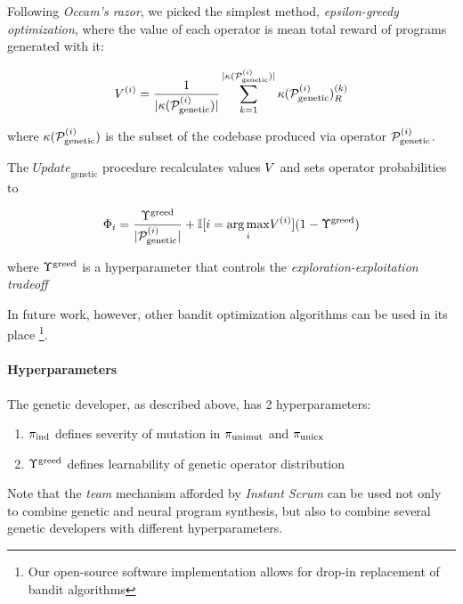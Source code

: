 Following \emph{Occam's razor}, we picked the simplest method, \emph{epsilon-greedy optimization}, where the value of each operator is mean total reward of programs generated with it:

\begin{equation}
    V^{(i)} = \frac{1}{|\kappa(\mathcal{P}_\text{genetic}^{(i)})|} 
    \sum\limits_{k=1}^{|\kappa(\mathcal{P}_\text{genetic}^{(i)})|}
    \kappa(\mathcal{P}_\text{genetic}^{(i)})_R^{(k)} 
\end{equation}

where $\kappa(\mathcal{P}_\text{genetic}^{(i)})$ is the subset of the codebase produced via operator $\mathcal{P}_\text{genetic}^{(i)}$.

The $\mathit{Update}_\text{genetic}$ procedure recalculates values $V$ and sets operator probabilities to

\begin{equation}
    \Phi_i = \frac{\Upsilon^\text{greed}}{|\mathcal{P}_\text{genetic}^{(i)}|} +
    \mathbb{I} [i = \underset{i}{\arg\max} V^{(i)}] (1 - \Upsilon^\text{greed})
\end{equation}

where $\Upsilon^\text{greed}$ is a hyperparameter that controls the \emph{exploration-exploitation tradeoff} \cite{macreadyBanditProblemsExploration1998}

In future work, however, other bandit optimization algorithms can be used in its place \footnote{Our open-source software implementation allows for drop-in replacement of bandit algorithms}.

\paragraph{Hyperparameters}

The genetic developer, as described above, has 2 hyperparameters:

\begin{enumerate}
    \item $\pi_\text{ind}$ defines severity of mutation in $\pi_\text{unimut}$ and $\pi_\text{unicx}$
    \item $\Upsilon^\text{greed}$ defines learnability of genetic operator distribution
\end{enumerate}

Note that the \emph{team} mechanism afforded by \emph{Instant Scrum} can be used not only to combine genetic and neural program synthesis, but also to combine several genetic developers with different hyperparameters.

